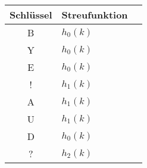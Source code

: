 \documentclass{bschlangaul-aufgabe}
\begin{document}
\begin{enumerate}
\begin{bAntwort}
\begin{center}
\begin{tabular}{|c||l|l|}
\hline
Schlüssel & Streufunktion\\
\hline
B & $h_0(k)$ \\
Y & $h_0(k)$ \\
E & $h_0(k)$ \\
! & $h_1(k)$ \\
A & $h_1(k)$ \\
U & $h_1(k)$ \\
D & $h_0(k)$ \\
? & $h_2(k)$ \\
\hline
\end{tabular}
\end{center}
\end{bAntwort}

\end{enumerate}
\end{document}
